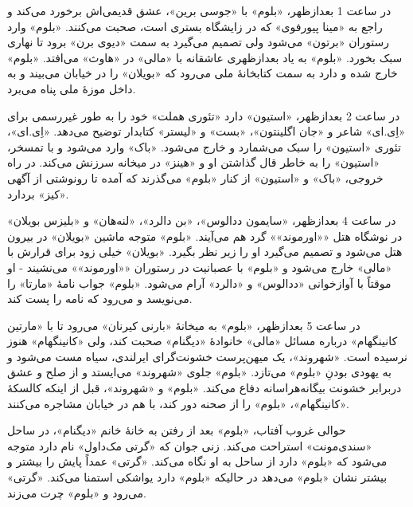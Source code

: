 \documentclass[12pt]{book}
\newcommand{\noun}[1]{«{#1}»}
\begin{document}
    در ساعت 1 بعدازظهر، \noun{بلوم} با \noun{جوسی برین}، عشق قدیمی‌اش برخورد می‌کند و راجع به \noun{مینا پیورفوی} که در زایشگاه بستری است، صحبت می‌کنند. \noun{بلوم} وارد رستوران \noun{برتون} می‌شود ولی تصمیم می‌گیرد به سمت \noun{دیوی برن} برود تا نهاری سبک بخورد. \noun{بلوم} به یاد بعدازظهری عاشقانه با \noun{مالی} در \noun{هاوث} می‌افتد. \noun{بلوم} خارج شده و دارد به سمت کتابخانۀ ملی می‌رود که \noun{بویلان} را در خیابان می‌بیند و به داخل موزۀ ملی پناه می‌برد.

    در ساعت 2 بعدازظهر، \noun{استیون} دارد «تئوری هملت» خود را به طور غیررسمی برای \noun{اِی.ای} شاعر و \noun{جان اگلینتون}، \noun{بست} و \noun{لیستر} کتابدار توضیح می‌دهد. \noun{اِی.ای}، تئوری \noun{استیون} را سبک می‌شمارد و خارج می‌شود. \noun{باک} وارد می‌شود و با تمسخر، \noun{استیون} را به خاطر قال گذاشتن او و \noun{هینز} در میخانه سرزنش می‌کند. در راه خروجی، \noun{باک} و \noun{استیون} از کنار \noun{بلوم} می‌گذرند که آمده تا رونوشتی از آگهی \noun{کیز} بردارد.

    در ساعت 4 بعدازظهر، \noun{سایمون ددالوس}، \noun{بن دالرد}، \noun{لنه‌هان} و \noun{بلیزس بویلان} در نوشگاه هتل \noun{\noun{اورموند}} گرد هم می‌آیند. \noun{بلوم} متوجه ماشین \noun{بویلان} در بیرون هتل می‌شود و تصمیم می‌گیرد او را زیر نظر بگیرد. \noun{بویلان} خیلی زود برای قرارش با \noun{مالی} خارج می‌شود و \noun{بلوم} با عصبانیت در رستوران \noun{\noun{اورموند}} می‌نشیند - او موقتاً با آوازخوانی \noun{ددالوس} و \noun{دالرد} آرام می‌شود. \noun{بلوم} جواب نامۀ \noun{مارتا} را می‌نویسد و می‌رود که نامه را پست کند.

    در ساعت 5 بعدازظهر، \noun{بلوم} به میخانۀ \noun{بارنی کیرنان} می‌رود تا با \noun{مارتین کانینگهام} درباره مسائل \noun{مالی} خانوادۀ \noun{دیگنام} صحبت کند، ولی \noun{کانینگهام} هنوز نرسیده است. \noun{شهروند}، یک میهن‌پرست خشونت‌گرای ایرلندی، سیاه مست می‌شود و به یهودی بودنِ \noun{بلوم} می‌تازد. \noun{بلوم} جلوی \noun{شهروند} می‌ایستد و از صلح و عشق دربرابر خشونت بیگانه‌هراسانه دفاع می‌کند. \noun{بلوم} و \noun{شهروند}، قبل از اینکه کالسکۀ \noun{کانینگهام}، \noun{بلوم} را از صحنه دور کند، با هم در خیابان مشاجره می‌کنند.

    حوالی غروب آفتاب، \noun{بلوم} بعد از رفتن به خانۀ خانم \noun{دیگنام}، در ساحل \noun{سندی‌مونت} استراحت می‌کند. زنی جوان که \noun{گرتی مک‌داول} نام دارد متوجه می‌شود که \noun{بلوم} دارد از ساحل به او نگاه می‌کند. \noun{گرتی} عمداً پایش را بیشتر و بیشتر نشان \noun{بلوم} می‌دهد در حالیکه \noun{بلوم} دارد یواشکی استمنا می‌کند. \noun{گرتی} می‌رود و \noun{بلوم} چرت می‌زند.
\end{document}
